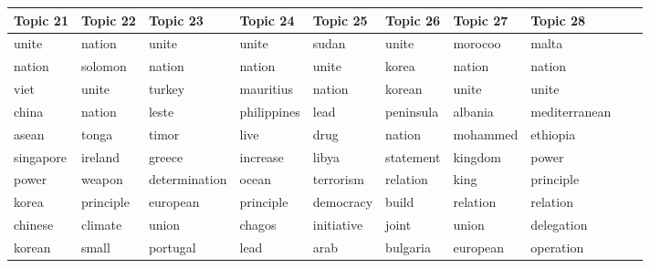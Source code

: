 \begin{table}[ht!]
{\begin{tabular}{llllllllll}
		\toprule
			Topic 21 & Topic 22 & Topic 23 & Topic 24 & Topic 25 & Topic 26 & Topic 27 & Topic 28 \\
		\midrule
			unite & nation & unite & unite & sudan & unite & morocoo & malta \\
			nation & solomon & nation & nation & unite & korea & nation & nation \\ 
			viet & unite & turkey & mauritius & nation & korean & unite & unite \\
			china & nation & leste & philippines & lead & peninsula & albania & mediterranean \\
			asean & tonga & timor & live & drug & nation & mohammed & ethiopia \\ 
			singapore & ireland & greece & increase & libya & statement & kingdom & power \\
			power & weapon & determination & ocean & terrorism & relation & king & principle \\ 
			korea & principle & european & principle & democracy & build & relation & relation \\
			chinese & climate & union & chagos & initiative & joint & union & delegation \\ 
			korean & small & portugal & lead & arab & bulgaria & european & operation \\
		\bottomrule
	\end{tabular}
}
\end{table}

